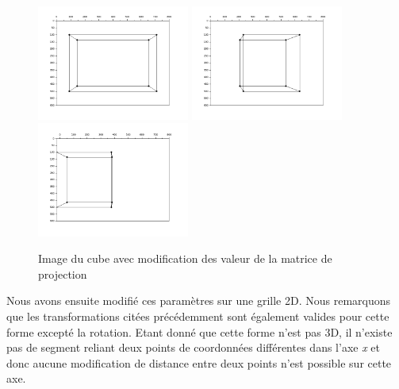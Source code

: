 \documentclass[a4paper,11pt]{article}
\begin{document}
  
  \begin{figure}[H]
    \center
    \includegraphics[width=5cm]{ProjectionTaille.png}
    \includegraphics[width=5cm]{ProjectionRotation.png}
    \includegraphics[width=5cm]{ProjectionTranslation.png}
    \caption{Image du cube avec modification des valeur de la matrice de projection}
  \end{figure}
  
  Nous avons ensuite modifié ces paramètres sur une grille 2D. Nous remarquons que 
  les transformations citées précédemment sont également valides pour cette forme 
  excepté la rotation. Etant donné que cette forme n'est pas 3D, il n'existe pas 
  de segment reliant deux points de coordonnées différentes dans l'axe \textit{x} et donc aucune
  modification de distance entre deux points n'est possible sur cette axe.
  
\end{document}
